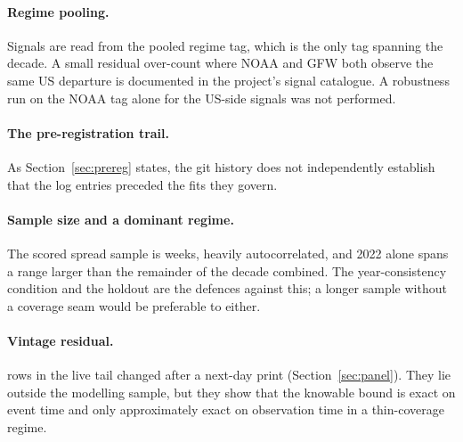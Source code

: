 \paragraph{Regime pooling.} Signals are read from the pooled regime tag, which is
the only tag spanning the decade. A small residual over-count where NOAA and GFW both
observe the same US departure is documented in the project's signal catalogue. A
robustness run on the NOAA tag alone for the US-side signals was not performed.

\paragraph{The pre-registration trail.} As Section~\ref{sec:prereg} states, the git
history does not independently establish that the log entries preceded the fits they
govern.

\paragraph{Sample size and a dominant regime.} The scored spread sample is
\bWeeksCov{} weeks, heavily autocorrelated, and 2022 alone spans a range larger than
the remainder of the decade combined. The year-consistency condition and the holdout
are the defences against this; a longer sample without a coverage seam would be
preferable to either.

\paragraph{Vintage residual.} \vintagePostDay{} rows in the live tail changed after a
next-day print (Section~\ref{sec:panel}). They lie outside the modelling sample, but
they show that the knowable bound is exact on event time and only approximately
exact on observation time in a thin-coverage regime.
